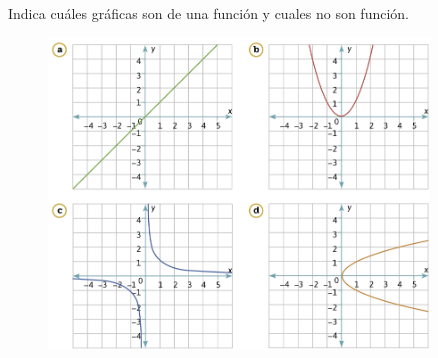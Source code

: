 Indica cuáles gráficas son de una función y cuales no son función.

\begin{figure}[H]
    \centering
    \includegraphics[width=0.9\textwidth]{../images/20230327053439}
    \caption{}
    \label{fig:20230327053439}
\end{figure}
